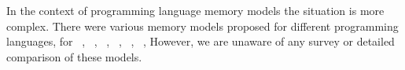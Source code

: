



In the context of programming language memory models the situation is more complex. 
There were various memory models proposed for different programming languages, \eg
for \Java~\cite{Manson-al:POPL05, Bender-Palsberg:OOPSLA19}, \CPP~\cite{Batty-al:POPL11}, 
\LLVM~\cite{Chakraborty-Vafeiadis:CGO17}, \JS~\cite{Watt-al:PLDI2020}, 
\OCaml~\cite{Manson-al:POPL05}, \Haskell~\cite{Vollmer-al:PPoPP17}, \etc 
However, we are unaware of any survey or detailed comparison of these models.

